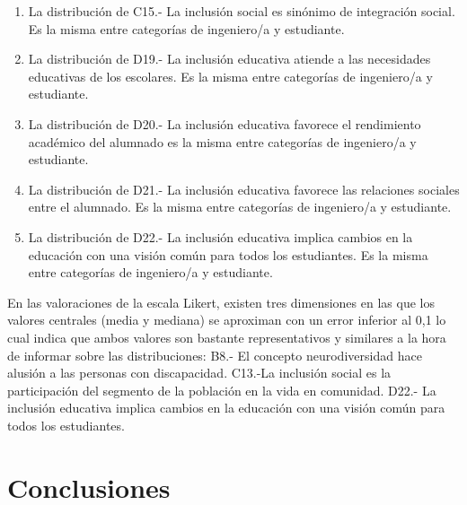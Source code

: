 \documentclass[spanish]{textolivre}
\begin{document}
\begin{enumerate}
    \item La distribución de C15.- La inclusión social es sinónimo de integración social. Es la misma entre categorías de ingeniero/a y estudiante.
    \item La distribución de D19.- La inclusión educativa atiende a las necesidades educativas de los escolares. Es la misma entre categorías de ingeniero/a y estudiante.
    \item La distribución de D20.- La inclusión educativa favorece el rendimiento académico del alumnado es la misma entre categorías de ingeniero/a y estudiante.
    \item La distribución de D21.- La inclusión educativa favorece las relaciones sociales entre el alumnado. Es la misma entre categorías de ingeniero/a y estudiante.
    \item La distribución de D22.- La inclusión educativa implica cambios en la educación con una visión común para todos los estudiantes. Es la misma entre categorías de ingeniero/a y estudiante.
\end{enumerate}

En las valoraciones de la escala Likert, existen tres dimensiones en las que los valores centrales (media y mediana) se aproximan con un error inferior al 0,1 lo cual indica que ambos valores son bastante representativos y similares a la hora de informar sobre las distribuciones:
B8.- El concepto neurodiversidad hace alusión a las personas con discapacidad.
C13.-La inclusión social es la participación del segmento de la población en la vida en comunidad.
D22.- La inclusión educativa implica cambios en la educación con una visión común para todos los estudiantes.

\section{Conclusiones}
\end{document}
